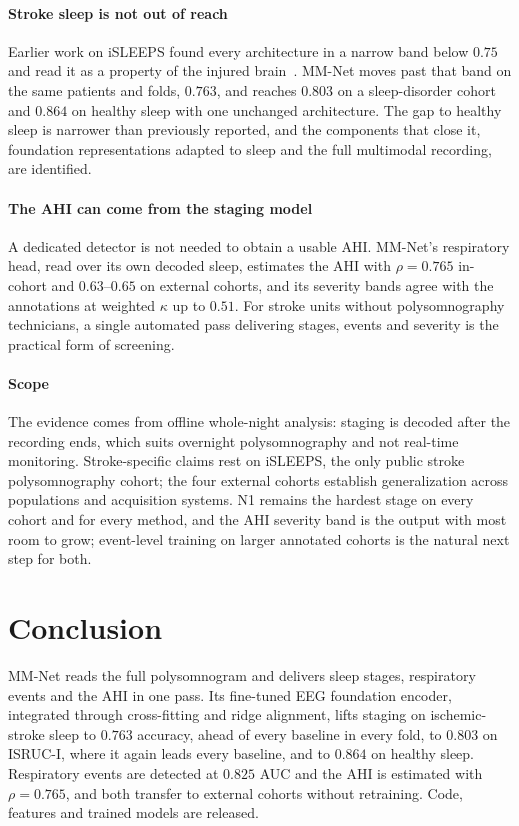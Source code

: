 \documentclass{ieeeaccess}
\begin{document}
\paragraph{Stroke sleep is not out of reach} Earlier work on iSLEEPS found every architecture in
a narrow band below $0.75$ and read it as a property of the injured brain~\cite{bose2026gap}.
MM-Net moves past that band on the same patients and folds, $0.763$, and reaches $0.803$ on a
sleep-disorder cohort and $0.864$ on healthy sleep with one unchanged architecture. The gap to
healthy sleep is narrower than previously reported, and the components that close it,
foundation representations adapted to sleep and the full multimodal recording, are
identified.

\paragraph{The AHI can come from the staging model} A dedicated detector is not needed to obtain
a usable AHI. MM-Net's respiratory head, read over its own decoded sleep, estimates the AHI with
$\rho=0.765$ in-cohort and $0.63$--$0.65$ on external cohorts, and its severity bands agree
with the annotations at weighted $\kappa$ up to $0.51$. For stroke units without polysomnography
technicians, a single automated pass delivering stages, events and severity is the practical
form of screening.

\paragraph{Scope} The evidence comes from offline whole-night analysis: staging is decoded after
the recording ends, which suits overnight polysomnography and not real-time monitoring.
Stroke-specific claims rest on iSLEEPS, the only public stroke polysomnography cohort; the four
external cohorts establish generalization across populations and acquisition systems. N1 remains
the hardest stage on every cohort and for every method, and the AHI severity band is the output
with most room to grow; event-level training on larger annotated cohorts is the natural next step
for both.

\section{Conclusion}
MM-Net reads the full polysomnogram and delivers sleep stages, respiratory events and the AHI
in one pass. Its fine-tuned EEG foundation encoder, integrated through cross-fitting and ridge
alignment, lifts staging on ischemic-stroke sleep to $0.763$ accuracy, ahead of every baseline in
every fold, to $0.803$ on ISRUC-I, where it again leads every baseline, and to $0.864$ on
healthy sleep. Respiratory events are detected
at $0.825$ AUC and the AHI is estimated with $\rho=0.765$, and both transfer to external
cohorts without retraining. Code, features and trained models are released.
\end{document}
